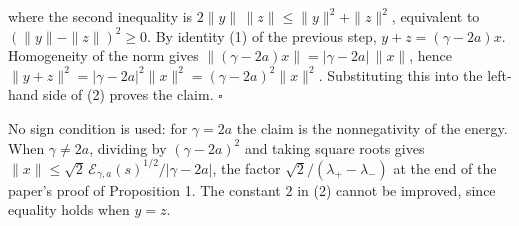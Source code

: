 \documentclass[11pt,a4paper]{article}
\begin{document}
where the second inequality is \(2\|y\|\,\|z\|\le\|y\|^2+\|z\|^2\), equivalent to \((\|y\|-\|z\|)^2\ge0\). By identity (1) of the previous step, \(y+z=(\gamma-2a)x\). Homogeneity of the norm gives \(\|(\gamma-2a)x\|=|\gamma-2a|\,\|x\|\), hence \(\|y+z\|^2=|\gamma-2a|^2\|x\|^2=(\gamma-2a)^2\|x\|^2\). Substituting this into the left-hand side of (2) proves the claim. \(\square\)




No sign condition is used: for \(\gamma=2a\) the claim is the nonnegativity of the energy. When \(\gamma\neq2a\), dividing by \((\gamma-2a)^2\) and taking square roots gives \(\|x\|\le\sqrt2\,\mathcal E_{\gamma,a}(s)^{1/2}/|\gamma-2a|\), the factor \(\sqrt2/(\lambda_+-\lambda_-)\) at the end of the paper's proof of Proposition 1. The constant \(2\) in (2) cannot be improved, since equality holds when \(y=z\).
\end{document}

